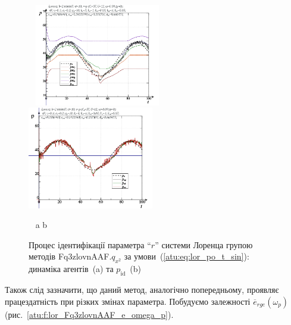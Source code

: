 \begin{figure}[ht!]
  \begin{center}
    ~ \hfill
    \includegraphics[width=0.49\textwidth]{p/cha/lor/Fq3zlovnAAF/lor_Fq3zlovnAAF_qx2-pl_n_sin.png}
    \hfill
    \includegraphics[width=0.49\textwidth]{p/cha/lor/Fq3zlovnAAF/lor_Fq3zlovnAAF_qx2-p_p_sin.png}
    \hfill ~
  \end{center}
  \vspace{-1.0ex}
  \begin{center}
    ~ \hfill a \hfill\hfill b \hfill ~
  \end{center}
  \vspace{-1.5ex}
  \caption{Процес ідентифікації параметра ``$r$'' системи Лоренца групою методів Fq3zlovnAAF.$q_{x^2} $ за умови~(\ref{atu:eq:lor_po_t_sin}): динаміка агентів~(a) та $p_\mathrm{id}$~(b)}
\label{atu:f:lor_id_Fq3zlovnAAF.q_x2_sin}
\end{figure}

Також слід зазначити, що даний метод, аналогічно попередньому,
проявляє працездатність при різких змінах параметра. Побудуємо
залежності
$\overline{e}_{rge}(\omega_p)$ (рис.~\ref{atu:f:lor_Fq3zlovnAAF_e_omega_p}).


